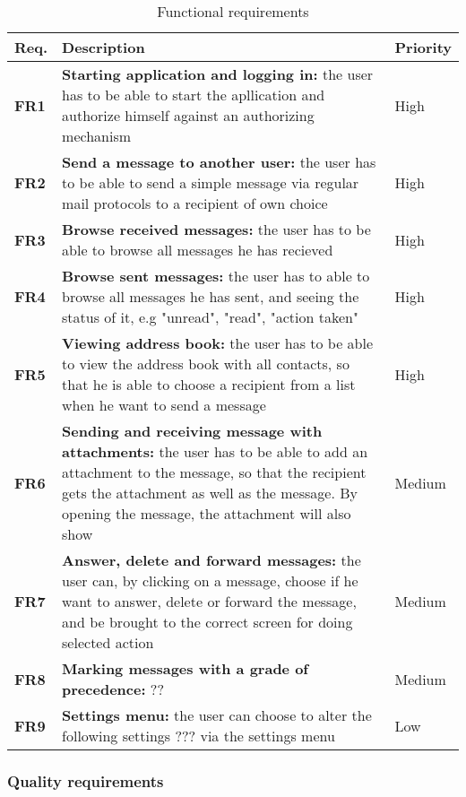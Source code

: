 \begin{table}
\begin{tabularx}{\linewidth}{>{\setlength\hsize{.2\hsize}}X|>{\setlength\hsize{1.8\hsize}}X|>{\setlength\hsize{0.3\hsize}}X}
\textbf{Req.} & \textbf{Description} & \textbf{Priority} \\ \hline \hline
\textbf{FR1} & \textbf{Starting application and logging in:} the user has to be able to start the apllication and authorize himself against an authorizing mechanism & High \\ \hline
\textbf{FR2} & \textbf{Send a message to another user:} the user has to be able to send a simple message via regular mail protocols to a recipient of own choice & High \\ \hline
\textbf{FR3} & \textbf{Browse received messages:} the user has to be able to browse all messages he has recieved & High \\ \hline
\textbf{FR4} & \textbf{Browse sent messages:} the user has to able to browse all messages he has sent, and seeing the status of it, e.g "unread", "read", "action taken" & High \\ \hline
\textbf{FR5} & \textbf{Viewing address book:} the user has to be able to view the address book with all contacts, so that he is able to choose a recipient from a list when he want to send a message & High \\ \hline
\textbf{FR6} & \textbf{Sending and receiving message with attachments:} the user has to be able to add an attachment to the message, so that the recipient gets the attachment as well as the message. By opening the message, the attachment will also show & Medium \\ \hline
\textbf{FR7} & \textbf{Answer, delete and forward messages:} the user can, by clicking on a message, choose if he want to answer, delete or forward the message, and be brought to the correct screen for doing selected action & Medium \\ \hline
\textbf{FR8} & \textbf{Marking messages with a grade of precedence:} ?? & Medium \\ \hline
\textbf{FR9} & \textbf{Settings menu:} the user can choose to alter the following settings ??? via the settings menu & Low
\end{tabularx}
\caption{Functional requirements} \label{tab:functionalreq}
\end{table}

\subsubsection{Quality requirements}

